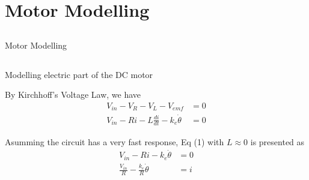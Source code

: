 \section{Motor Modelling}


\subsection{}
{
\begin{frame}{Motor Modelling}

	\vspace{-3mm}
   	\begin{figure}
 	\end{figure}


\end{frame}
}




\subsection{}
{
\begin{frame}{Modelling electric part of the DC motor}

By Kirchhoff's Voltage Law, we have
\begin{equation}
\begin{split}
V_{in} - V_{R} - V_{L} - V_{emf} &= 0 \\
V_{in} - Ri - L \frac{di}{dt} - k_e \dot \theta  &= 0
\end{split}
\end{equation}

Asumming the circuit has a very fast response,
Eq (1) with $L \approx 0$ is presented as
\begin{equation}
\begin{split}
V_{in} - Ri - k_e \dot \theta &=0 \\
\frac{V_{in}}{R} - \frac{k_e}{R} \dot \theta &= i
\end{split}
\end{equation}



\end{frame}
}


